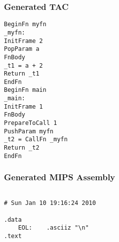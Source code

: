 \subsubsection{Generated TAC}
\begin{lstlisting}[showstringspaces=false,breaklines=true,backgroundcolor=\color{light-gray}, captionpos=b]
BeginFn myfn
_myfn:
InitFrame 2
PopParam a
FnBody
_t1 = a + 2
Return _t1
EndFn
BeginFn main
_main:
InitFrame 1
FnBody
PrepareToCall 1
PushParam myfn
_t2 = CallFn _myfn
Return _t2
EndFn

\end{lstlisting}\subsubsection{Generated MIPS Assembly}
\begin{lstlisting}[showstringspaces=false,breaklines=true,backgroundcolor=\color{light-gray}, captionpos=b]
         
# Sun Jan 10 19:16:24 2010

.data
	EOL:	.asciiz "\n"
.text


\end{lstlisting}
